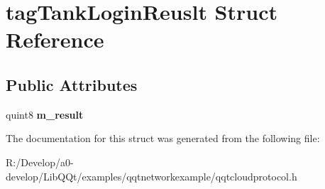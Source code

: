 \hypertarget{structtag_tank_login_reuslt}{}\section{tag\+Tank\+Login\+Reuslt Struct Reference}
\label{structtag_tank_login_reuslt}
\subsection*{Public Attributes}
\begin{DoxyCompactItemize}
\item 
\mbox{\label{structtag_tank_login_reuslt_afd0cd721149affc23cca0655d8106031}} 
quint8 {\bfseries m\+\_\+result}
\end{DoxyCompactItemize}


The documentation for this struct was generated from the following file\+:\begin{DoxyCompactItemize}
\item 
R\+:/\+Develop/a0-\/develop/\+Lib\+Q\+Qt/examples/qqtnetworkexample/qqtcloudprotocol.\+h\end{DoxyCompactItemize}
